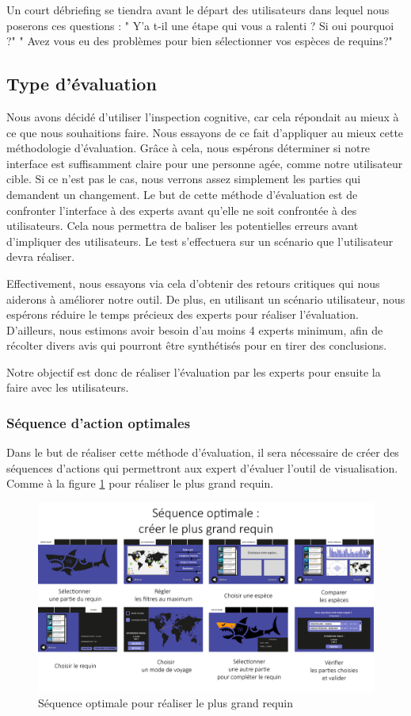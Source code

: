 \documentclass{article}
\begin{document}
Un court débriefing se tiendra avant le départ des utilisateurs dans lequel nous poserons ces questions :
" Y'a t-il une étape qui vous a ralenti ? Si oui pourquoi ?"
" Avez vous eu des problèmes pour bien sélectionner vos espèces de requins?"
\subsection{Type d'évaluation}
Nous avons décidé d'utiliser l'inspection cognitive, car cela répondait au mieux à ce que nous souhaitions faire. Nous essayons de ce fait d'appliquer au mieux cette méthodologie d'évaluation. Grâce à cela, nous espérons déterminer si notre interface est suffisamment claire pour une personne agée, comme notre utilisateur cible. Si ce n'est pas le cas, nous verrons assez simplement les parties qui demandent un changement.
Le but de cette méthode d'évaluation est de confronter l'interface à des experts avant qu'elle ne soit confrontée à des utilisateurs. Cela nous permettra de baliser les potentielles erreurs avant d'impliquer des utilisateurs.
Le test s'effectuera sur un scénario que l'utilisateur devra réaliser.

Effectivement, nous essayons via cela d'obtenir des retours critiques qui nous aiderons à améliorer notre outil.
De plus, en utilisant un scénario utilisateur, nous espérons réduire le temps précieux des experts pour réaliser l'évaluation.
D'ailleurs, nous estimons avoir besoin d'au moins 4 experts minimum, afin de récolter divers avis qui pourront être synthétisés pour en tirer des conclusions.

Notre objectif est donc de réaliser l'évaluation par les experts pour ensuite la faire avec les utilisateurs.

\subsubsection{Séquence d'action optimales}
Dans le but de réaliser cette méthode d'évaluation, il sera nécessaire de créer des séquences d'actions qui permettront aux expert d'évaluer l'outil de visualisation. Comme à la figure \ref{sequence_optimale} pour réaliser le plus grand requin.
\begin{figure}[!h]
	\centering
	\includegraphics[width=14.4cm]{assets/sequence_optimale}
	\caption{Séquence optimale pour réaliser le plus grand requin}
	\label{sequence_optimale}
\end{figure}
\FloatBarrier
\end{document}
